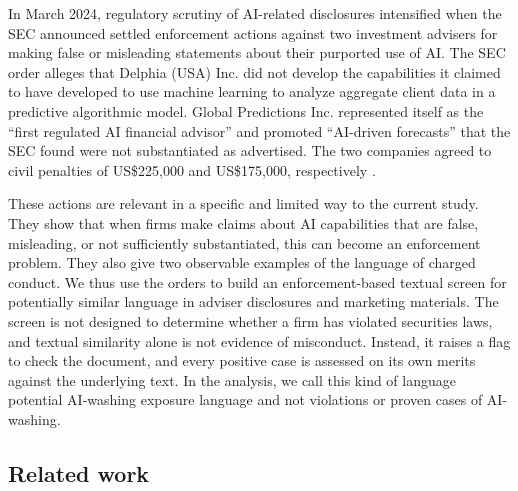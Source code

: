 \documentclass[utf8]{FrontiersinHarvard}
\begin{document}
In March 2024, regulatory scrutiny of AI-related disclosures intensified when the SEC announced settled enforcement actions against two investment advisers for making false or misleading statements about their purported use of AI. The SEC order alleges that Delphia (USA) Inc. did not develop the capabilities it claimed to have developed to use machine learning to analyze aggregate client data in a predictive algorithmic model. Global Predictions Inc. represented itself as the ``first regulated AI financial advisor'' and promoted ``AI-driven forecasts'' that the SEC found were not substantiated as advertised. The two companies agreed to civil penalties of US\$225{,}000 and US\$175{,}000, respectively \citep{usSEC2024a,usSEC2024b}.

These actions are relevant in a specific and limited way to the current study. They show that when firms make claims about AI capabilities that are false, misleading, or not sufficiently substantiated, this can become an enforcement problem. They also give two observable examples of the language of charged conduct. We thus use the orders to build an enforcement-based textual screen for potentially similar language in adviser disclosures and marketing materials. The screen is not designed to determine whether a firm has violated securities laws, and textual similarity alone is not evidence of misconduct. Instead, it raises a flag to check the document, and every positive case is assessed on its own merits against the underlying text. In the analysis, we call this kind of language potential AI-washing exposure language and not violations or proven cases of AI-washing.

\subsection{Related work}
\end{document}
